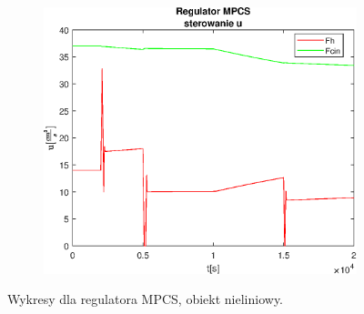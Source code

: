 \begin{figure}[h!]
   \begin{subfigure}[b]{0.4\textwidth}
      \includegraphics[width=1\linewidth]{img/MPCSanaRK/MPCSRKControlN50Nu10l100.eps}
      \caption{}
      \label{fig:fig:MPCSRKN50Nu10l1003}
   \end{subfigure}
       
   \caption{Wykresy dla regulatora MPCS, obiekt nieliniowy.}
   \label{fig:MPCSRKN50Nu10l100}
\end{figure}
           
